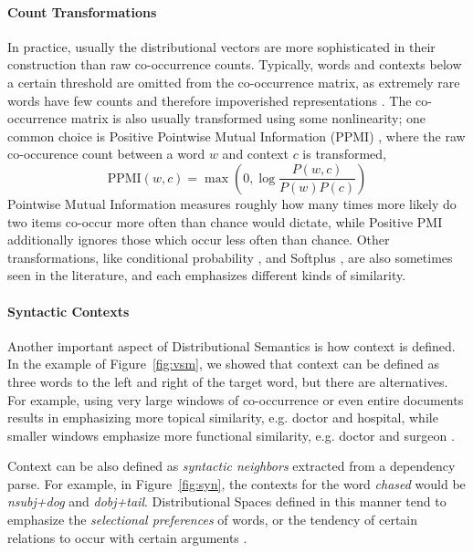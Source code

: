 \documentclass[12pt]{article}
\begin{document}
\paragraph{Count Transformations}
In practice, usually the distributional vectors are more sophisticated in their
construction than raw co-occurrence counts.  Typically, words and contexts
below a certain threshold are omitted from the co-occurrence matrix, as
extremely rare words have few counts and therefore impoverished representations
\cite{turney:2010:jair}. The co-occurrence matrix is also usually transformed
using some nonlinearity; one common choice is Positive Pointwise Mutual
Information (PPMI) \cite{bullinaria:2007:brm}, where the raw co-occurence count
between a word $w$ and context $c$ is transformed,
\begin{equation*}
  \text{PPMI}(w, c) = \max\left(0, \log\frac{P(w, c)}{P(w)P(c)}\right)
\end{equation*}
Pointwise Mutual Information measures roughly how many times more likely do two
items co-occur more often than chance would dictate, while Positive PMI
additionally ignores those which occur less often than chance.  Other
transformations, like conditional probability
\cite{hofman:1999:sigir,blei:2003:jmlr}, and Softplus
\cite{pennington:2014:emnlp}, are also sometimes seen in the literature, and
each emphasizes different kinds of similarity.

\paragraph{Syntactic Contexts}
Another important aspect of Distributional Semantics is how context is defined.
In the example of Figure~\ref{fig:vsm}, we showed that context can be defined
as three words to the left and right of the target word, but there are
alternatives. For example, using very large windows of co-occurrence or even
entire documents results in emphasizing more topical similarity, e.g. doctor
and hospital, while smaller windows emphasize more functional similarity, e.g.
doctor and surgeon \cite{pado:2007:cl,erk:2008:emnlp,levy:2014:acl}.

Context can be also defined as {\em syntactic neighbors} extracted from a
dependency parse. For example, in Figure~\ref{fig:syn}, the
contexts for the word {\em chased} would be {\em nsubj+dog} and {\em
dobj+tail}. Distributional Spaces defined in this manner tend to emphasize the
{\em selectional preferences} of words, or the tendency of certain relations to
occur with certain arguments
\cite{pado:2007:cl,erk:2008:emnlp,baroni:2010:cl,levy:2014:acl}.
\end{document}
